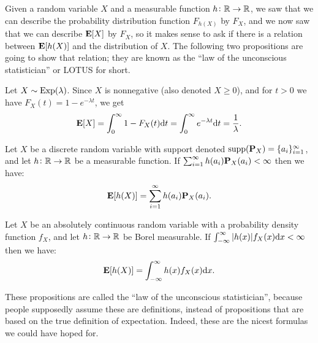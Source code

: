 \documentclass[11pt,a4paper]{article}
\begin{document}
\begin{remark}
  Given a random variable $X$ and a measurable function $h \colon \mathbb{R} \to \mathbb{R}$,
  we saw that we can describe the probability distribution function $F_{h(X)}$
  by $F_X$, and we now saw that we can describe $\mathbf{E}[X]$ by $F_X$,
  so it makes sense to ask if there is a relation between $\mathbf{E}[h(X)]$
  and the distribution of $X$.
  The following two propositions are going to show that relation;
  they are known as the
  ``law of the unconscious statistician'' or LOTUS for short.
\end{remark}

\begin{example}
  Let $X \sim \operatorname{Exp}(\lambda)$.
  Since $X$ is nonnegative (also denoted $X \geq 0$),
  and for $t > 0$ we have $F_X(t) = 1 - e^{-\lambda t}$,
  we get
  \[
    \mathbf{E}[X] =
    \int_{0}^{\infty} 1 - F_X(t) \mathrm{d} t =
    \int_{0}^{\infty} e^{-\lambda t} \mathrm{d} t = \frac{1}{\lambda}.
  \]
\end{example}

\begin{proposition}
  \label{prop:lotus-discrete}
  Let $X$ be a discrete random variable
  with support denoted $\operatorname{supp}(\mathbf{P}_X) = \{a_i\}_{i=1}^{\infty}$,
  and let $h \colon \mathbb{R} \to \mathbb{R}$ be a measurable function.
  If $\sum_{i=1}^{\infty} h(a_i) \mathbf{P}_X(a_i) < \infty$
  then we have:
  \[
    \mathbf{E}[h(X)] = \sum_{i=1}^{\infty} h(a_i) \mathbf{P}_X(a_i).
  \]
\end{proposition}

\begin{proposition}
  \label{prop:lotus-continuous}
  Let $X$ be an absolutely continuous random variable with a probability
  density function $f_X$,
  and let $h \colon \mathbb{R} \to \mathbb{R}$ be Borel measurable.
  If $\int_{-\infty}^{\infty} |h(x)| f_X(x) \dx < \infty$
  then we have:
  \[
    \E[h(X)] = \int_{-\infty}^{\infty} h(x) f_X(x) \dx.
  \]
\end{proposition}

\begin{remark}
  These propositions are called the ``law of the unconscious statistician'',
  because people supposedly assume these are definitions,
  instead of propositions that are based on the true definition of expectation.
  Indeed, these are the nicest formulas we could have hoped for.
\end{remark}
\end{document}
